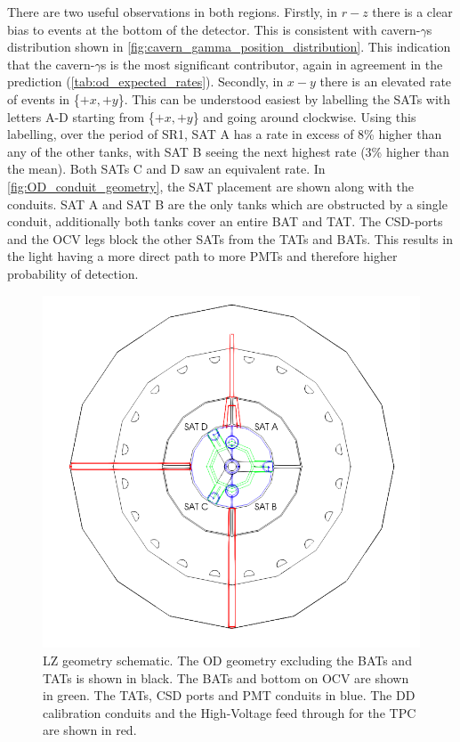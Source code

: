 

\par
There are two useful observations in both regions.
Firstly, in $r-z$ there is a clear bias to events at the bottom of the detector.
This is consistent with cavern-$\gamma$s distribution shown in \autoref{fig:cavern_gamma_position_distribution}.
This indication that the cavern-$\gamma$s is the most significant contributor, again in agreement in the prediction (\autoref{tab:od_expected_rates}).
Secondly, in $x-y$ there is an elevated rate of events in \{$+x,+y$\}.
This can be understood easiest by labelling the SATs with letters A-D starting from \{$+x,+y$\} and going around clockwise.
Using this labelling, over the period of SR1, SAT A has a rate in excess of 8\% higher than any of the other tanks, with SAT B seeing the next highest rate (3\% higher than the mean).
Both SATs C and D saw an equivalent rate.
In \autoref{fig:OD_conduit_geometry}, the SAT placement are shown along with the conduits.
SAT A and SAT B are the only tanks which are obstructed by a single conduit, additionally both tanks cover an entire BAT and TAT.
The CSD-ports and the OCV legs block the other SATs from the TATs and BATs.
This results in the light having a more direct path to more PMTs and therefore higher probability of detection.

\begin{figure}[!htbp]
\includegraphics[width=\textwidth]{Figures/Geometry/geometry_with_conduits.png}
\centering
\caption{LZ geometry schematic. The OD geometry excluding the BATs and TATs is shown in black. The BATs and bottom on OCV are shown in green. The TATs, CSD ports and PMT conduits in blue. The DD calibration conduits and the High-Voltage feed through for the TPC are shown in red.}
\label{fig:OD_conduit_geometry}
\end{figure}


